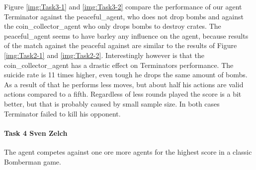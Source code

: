 \documentclass[
	letterpaper, %
	12pt, %
]{CSUniSchoolLabReport}
\begin{document}
Figure \ref{img:Task3-1} and \ref{img:Task3-2} compare the performance of our agent Terminator against the peaceful\_agent, who does not drop bombs and against the coin\_collector\_agent who only drops bombs to destroy crates.
The peaceful\_agent seems to have barley any influence on the agent, because results of the match against the peaceful against are similar to the results of Figure \ref{img:Task2-1} and \ref{img:Task2-2}.
Interestingly however is that the coin\_collector\_agent has a drastic effect on Terminators performance.
The suicide rate is 11 times higher, even tough he drops the same amount of bombs.
As a result of that he performs less moves, but about half his actions are valid actions compared to a fifth.
Regardless of less rounds played the score is a bit better, but that is probably caused by small sample size.
In both cases Terminator failed to kill his opponent.

\paragraph{Task 4 \tiny Sven Zelch}

The agent competes against one ore more agents for the highest score in a classic Bomberman game.
\end{document}
